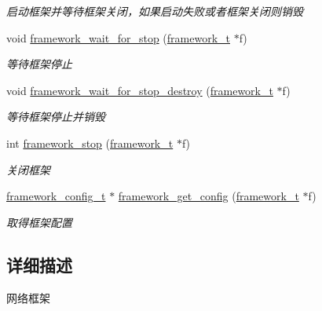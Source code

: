 \begin{DoxyCompactItemize}
\begin{DoxyCompactList}\small\item\em 启动框架并等待框架关闭，如果启动失败或者框架关闭则销毁 \end{DoxyCompactList}\item 
void \hyperlink{a00102_gaefec7da1b548ddb97c73c8924ba17069_gaefec7da1b548ddb97c73c8924ba17069}{framework\+\_\+wait\+\_\+for\+\_\+stop} (\hyperlink{a00050_a6149d769f6f07ed14a40a271c95d8463_a6149d769f6f07ed14a40a271c95d8463}{framework\+\_\+t} $\ast$f)
\begin{DoxyCompactList}\small\item\em 等待框架停止 \end{DoxyCompactList}\item 
void \hyperlink{a00102_gada1de96de1586411c77b5357a7b2376a_gada1de96de1586411c77b5357a7b2376a}{framework\+\_\+wait\+\_\+for\+\_\+stop\+\_\+destroy} (\hyperlink{a00050_a6149d769f6f07ed14a40a271c95d8463_a6149d769f6f07ed14a40a271c95d8463}{framework\+\_\+t} $\ast$f)
\begin{DoxyCompactList}\small\item\em 等待框架停止并销毁 \end{DoxyCompactList}\item 
int \hyperlink{a00102_ga429be76d09278d6170f1b519f4dbb689_ga429be76d09278d6170f1b519f4dbb689}{framework\+\_\+stop} (\hyperlink{a00050_a6149d769f6f07ed14a40a271c95d8463_a6149d769f6f07ed14a40a271c95d8463}{framework\+\_\+t} $\ast$f)
\begin{DoxyCompactList}\small\item\em 关闭框架 \end{DoxyCompactList}\item 
\hyperlink{a00050_a55b26efa9e6ee05514d087ba2593a54b_a55b26efa9e6ee05514d087ba2593a54b}{framework\+\_\+config\+\_\+t} $\ast$ \hyperlink{a00102_gaf0524cc257c8e57ba11d676dcca6bf64_gaf0524cc257c8e57ba11d676dcca6bf64}{framework\+\_\+get\+\_\+config} (\hyperlink{a00050_a6149d769f6f07ed14a40a271c95d8463_a6149d769f6f07ed14a40a271c95d8463}{framework\+\_\+t} $\ast$f)
\begin{DoxyCompactList}\small\item\em 取得框架配置 \end{DoxyCompactList}\end{DoxyCompactItemize}


\subsection{详细描述}
网络框架 


